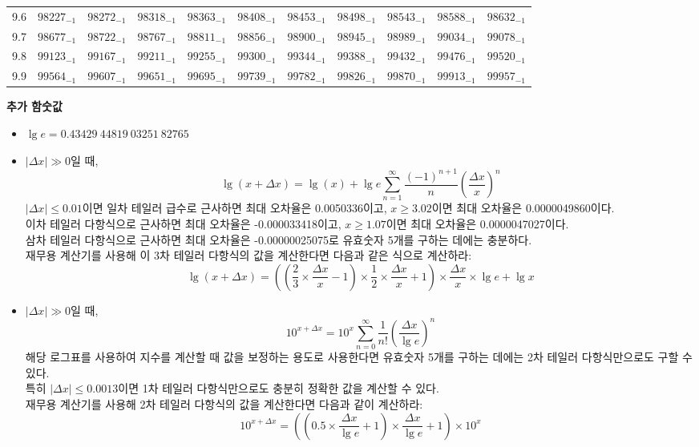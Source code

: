 \documentclass[10pt, a4paper]{article}
\begin{document}
\begin{center}
\begin{longtable}{c || c c c c c | c c c c c}
        9.6 & \({98227}_{-1}\) & \({98272}_{-1}\) & \({98318}_{-1}\) & \({98363}_{-1}\) & \({98408}_{-1}\) & \({98453}_{-1}\) & \({98498}_{-1}\) & \({98543}_{-1}\) & \({98588}_{-1}\) & \({98632}_{-1}\)\\
        9.7 & \({98677}_{-1}\) & \({98722}_{-1}\) & \({98767}_{-1}\) & \({98811}_{-1}\) & \({98856}_{-1}\) & \({98900}_{-1}\) & \({98945}_{-1}\) & \({98989}_{-1}\) & \({99034}_{-1}\) & \({99078}_{-1}\)\\
        9.8 & \({99123}_{-1}\) & \({99167}_{-1}\) & \({99211}_{-1}\) & \({99255}_{-1}\) & \({99300}_{-1}\) & \({99344}_{-1}\) & \({99388}_{-1}\) & \({99432}_{-1}\) & \({99476}_{-1}\) & \({99520}_{-1}\)\\
        9.9 & \({99564}_{-1}\) & \({99607}_{-1}\) & \({99651}_{-1}\) & \({99695}_{-1}\) & \({99739}_{-1}\) & \({99782}_{-1}\) & \({99826}_{-1}\) & \({99870}_{-1}\) & \({99913}_{-1}\) & \({99957}_{-1}\)\\
        \hline
    \end{longtable}
    
    \pagebreak
    \textbf{추가 함숫값}
    \begin{itemize}
        \item \(\lg{e}=0.43429\ 44819\ 03251\ 82765\)
        \item 
        \(\left\lvert\Delta x\right\rvert \gg 0\)일 때, 
        \[\lg\left(x+\Delta x\right) = \lg\left(x\right) + \lg{e}\sum_{n=1}^{\infty}{\frac{\left(-1\right)^{n+1}}{n}\left(\frac{\Delta x}{x}\right)^{n}}\]
        \(\left\lvert\Delta x\right\rvert \leq 0.01\)이면 일차 테일러 급수로 근사하면 최대 오차율은 0.0050336이고, \(x \geq 3.02\)이면 최대 오차율은 0.0000049860이다. \\
        이차 테일러 다항식으로 근사하면 최대 오차율은 -0.000033418이고, \(x \geq 1.07\)이면 최대 오차율은 0.0000047027이다. \\
        삼차 테일러 다항식으로 근사하면 최대 오차율은 -0.00000025075로 유효숫자 5개를 구하는 데에는 충분하다. \\
        재무용 계산기를 사용해 이 3차 테일러 다항식의 값을 계산한다면 다음과 같은 식으로 계산하라:
        \[\lg\left(x+\Delta x\right)=\left(\left(\frac{2}{3}\times\frac{\Delta x}{x} - 1\right)\times\frac{1}{2}\times\frac{\Delta x}{x} + 1\right) \times \frac{\Delta x}{x}\times\lg{e} + \lg{x}\]
        \item 
        \(\left\lvert\Delta x\right\rvert \gg 0\)일 때, 
        \[{10}^{x+\Delta x} = {10}^{x}\sum_{n=0}^{\infty}{\frac{1}{n!}\left(\frac{\Delta x}{\lg{e}}\right)^{n}}\]
        해당 로그표를 사용하여 지수를 계산할 때 값을 보정하는 용도로 사용한다면 유효숫자 5개를 구하는 데에는 2차 테일러 다항식만으로도 구할 수 있다. \\
        특히 \(\left\lvert\Delta{x}\right\rvert \leq 0.0013\)이면 1차 테일러 다항식만으로도 충분히 정확한 값을 계산할 수 있다. \\
        재무용 계산기를 사용해 2차 테일러 다항식의 값을 계산한다면 다음과 같이 계산하라: 
        \[{10}^{x+\Delta x}= \left(\left(0.5 \times \frac{\Delta{x}}{\lg{e}} + 1\right) \times \frac{\Delta x}{\lg{e}} + 1\right) \times {10}^{x}\]
    \end{itemize}
\end{center}
\end{document}
